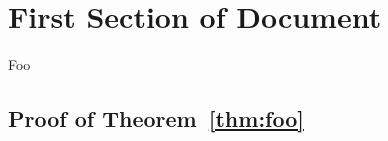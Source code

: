 \documentclass{scrartcl}
\begin{document}
\tableofcontents

\section{First Section of Document}
\label{seq:first-section}

\begin{theoremrep}
  \label{thm:foo}
  Foo
\end{theoremrep}

\begin{toappendix}
  \section{Proof of Theorem~\ref{thm:foo}}
\end{toappendix}
\end{document}
